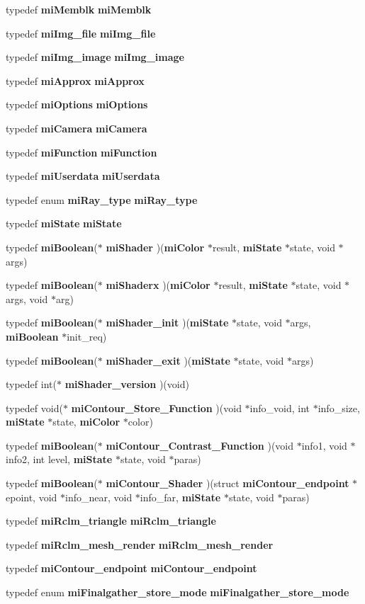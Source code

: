 \begin{CompactItemize}
typedef {\bf mi\-Memblk} {\bf mi\-Memblk}
\item 
typedef {\bf mi\-Img\_\-file} {\bf mi\-Img\_\-file}
\item 
typedef {\bf mi\-Img\_\-image} {\bf mi\-Img\_\-image}
\item 
typedef {\bf mi\-Approx} {\bf mi\-Approx}
\item 
typedef {\bf mi\-Options} {\bf mi\-Options}
\item 
typedef {\bf mi\-Camera} {\bf mi\-Camera}
\item 
typedef {\bf mi\-Function} {\bf mi\-Function}
\item 
typedef {\bf mi\-Userdata} {\bf mi\-Userdata}
\item 
typedef enum {\bf mi\-Ray\_\-type} {\bf mi\-Ray\_\-type}
\item 
typedef {\bf mi\-State} {\bf mi\-State}
\item 
typedef {\bf mi\-Boolean}($\ast$ {\bf mi\-Shader} )({\bf mi\-Color} $\ast$result, {\bf mi\-State} $\ast$state, void $\ast$args)
\item 
typedef {\bf mi\-Boolean}($\ast$ {\bf mi\-Shaderx} )({\bf mi\-Color} $\ast$result, {\bf mi\-State} $\ast$state, void $\ast$args, void $\ast$arg)
\item 
typedef {\bf mi\-Boolean}($\ast$ {\bf mi\-Shader\_\-init} )({\bf mi\-State} $\ast$state, void $\ast$args, {\bf mi\-Boolean} $\ast$init\_\-req)
\item 
typedef {\bf mi\-Boolean}($\ast$ {\bf mi\-Shader\_\-exit} )({\bf mi\-State} $\ast$state, void $\ast$args)
\item 
typedef int($\ast$ {\bf mi\-Shader\_\-version} )(void)
\item 
typedef void($\ast$ {\bf mi\-Contour\_\-Store\_\-Function} )(void $\ast$info\_\-void, int $\ast$info\_\-size, {\bf mi\-State} $\ast$state, {\bf mi\-Color} $\ast$color)
\item 
typedef {\bf mi\-Boolean}($\ast$ {\bf mi\-Contour\_\-Contrast\_\-Function} )(void $\ast$info1, void $\ast$info2, int level, {\bf mi\-State} $\ast$state, void $\ast$paras)
\item 
typedef {\bf mi\-Boolean}($\ast$ {\bf mi\-Contour\_\-Shader} )(struct {\bf mi\-Contour\_\-endpoint} $\ast$epoint, void $\ast$info\_\-near, void $\ast$info\_\-far, {\bf mi\-State} $\ast$state, void $\ast$paras)
\item 
typedef {\bf mi\-Rclm\_\-triangle} {\bf mi\-Rclm\_\-triangle}
\item 
typedef {\bf mi\-Rclm\_\-mesh\_\-render} {\bf mi\-Rclm\_\-mesh\_\-render}
\item 
typedef {\bf mi\-Contour\_\-endpoint} {\bf mi\-Contour\_\-endpoint}
\item 
typedef enum {\bf mi\-Finalgather\_\-store\_\-mode} {\bf mi\-Finalgather\_\-store\_\-mode}
\end{CompactItemize}
